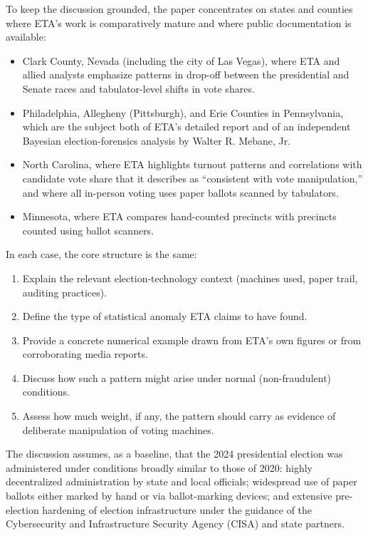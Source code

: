 \documentclass[12pt]{article}
\begin{document}
To keep the discussion grounded, the paper concentrates on states and counties where ETA's work is comparatively mature and where public documentation is available:

\begin{itemize}
    \item Clark County, Nevada (including the city of Las Vegas), where ETA and allied analysts emphasize patterns in drop-off between the presidential and Senate races and tabulator-level shifts in vote shares.
    \item Philadelphia, Allegheny (Pittsburgh), and Erie Counties in Pennsylvania, which are the subject both of ETA's detailed report and of an independent Bayesian election-forensics analysis by Walter R. Mebane, Jr.
    \item North Carolina, where ETA highlights turnout patterns and correlations with candidate vote share that it describes as ``consistent with vote manipulation,'' and where all in-person voting uses paper ballots scanned by tabulators.
    \item Minnesota, where ETA compares hand-counted precincts with precincts counted using ballot scanners.
\end{itemize}

In each case, the core structure is the same:

\begin{enumerate}
    \item Explain the relevant election-technology context (machines used, paper trail, auditing practices).
    \item Define the type of statistical anomaly ETA claims to have found.
    \item Provide a concrete numerical example drawn from ETA's own figures or from corroborating media reports.
    \item Discuss how such a pattern might arise under normal (non-fraudulent) conditions.
    \item Assess how much weight, if any, the pattern should carry as evidence of deliberate manipulation of voting machines.
\end{enumerate}

The discussion assumes, as a baseline, that the 2024 presidential election was administered under conditions broadly similar to those of 2020: highly decentralized administration by state and local officials; widespread use of paper ballots either marked by hand or via ballot-marking devices; and extensive pre-election hardening of election infrastructure under the guidance of the Cybersecurity and Infrastructure Security Agency (CISA) and state partners.
\end{document}
